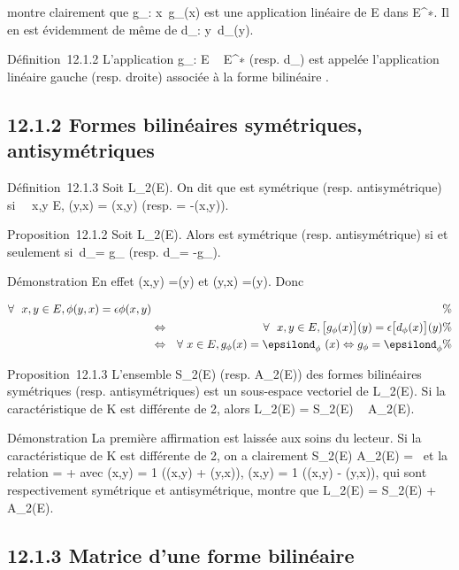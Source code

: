 \documentclass[]{article}
\begin{document}
montre clairement que g_\phi :
x\mapsto~g_\phi(x) est une application
linéaire de E dans E^∗. Il en est évidemment de même de
d_\phi : y\mapsto~d_\phi(y).

Définition~12.1.2 L'application g_\phi : E \rightarrow~ E^∗ (resp.
d_\phi) est appelée l'application linéaire gauche (resp. droite)
associée à la forme bilinéaire \phi.

\subsection{12.1.2 Formes bilinéaires symétriques, antisymétriques}

Définition~12.1.3 Soit \phi \in L_2(E). On dit que \phi est symétrique
(resp. antisymétrique) si \forall~~x,y \in E, \phi(y,x) =
\phi(x,y) (resp. = -\phi(x,y)).

Proposition~12.1.2 Soit \phi \in L_2(E). Alors \phi est symétrique
(resp. antisymétrique) si et seulement si~d_\phi = g_\phi
(resp. d_\phi = -g_\phi).

Démonstration En effet \phi(x,y) =(y) et \phi(y,x)
=(y). Donc

\begin{align*} \forall~~x,y \in E,
\phi(y,x) = \epsilon\phi(x,y)&& \%& \\ &
\Leftrightarrow & \forall~~x,y \in E,
\big [g_\phi(x)\big ](y) =
\epsilon\big [d_\phi(x)\big ](y) \%&
\\ & \Leftrightarrow &
\forall~x \in E, g_\phi(x) = \epsilond_\phi~(x)
\Leftrightarrow g_\phi = \epsilond_\phi\%&
\\ \end{align*}

Proposition~12.1.3 L'ensemble S_2(E) (resp. A_2(E))
des formes bilinéaires symétriques (resp. antisymétriques) est un
sous-espace vectoriel de L_2(E). Si la caractéristique de K est
différente de 2, alors L_2(E) = S_2(E) \oplus~
A_2(E).

Démonstration La première affirmation est laissée aux soins du lecteur.
Si la caractéristique de K est différente de 2, on a clairement
S_2(E) \bigcap A_2(E) =
\0\ et la relation \phi = \psi + \theta avec
\psi(x,y) = 1  (\phi(x,y) + \phi(y,x)), \theta(x,y) = 1
 (\phi(x,y) - \phi(y,x)), qui sont respectivement
symétrique et antisymétrique, montre que L_2(E) =
S_2(E) + A_2(E).

\subsection{12.1.3 Matrice d'une forme bilinéaire}
\end{document}
